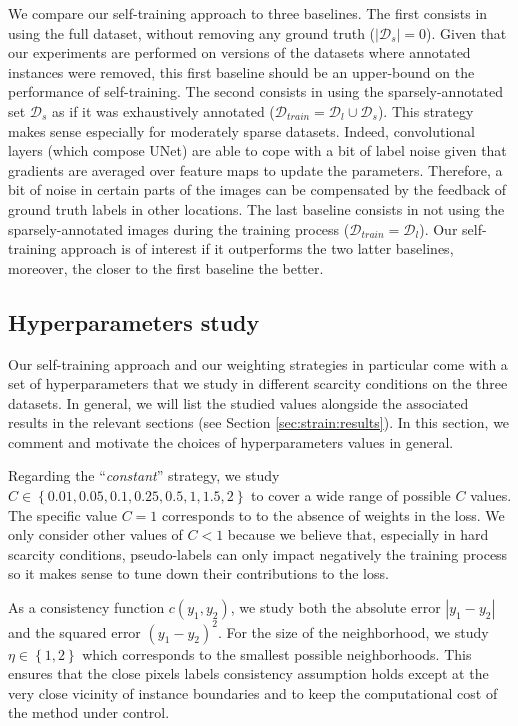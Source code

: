 We compare our self-training approach to three baselines. The first consists in using the full dataset, without removing any ground truth (\ie $|\mathcal{D}_s| = 0$). Given that our experiments are performed on versions of the datasets where annotated instances were removed, this first baseline should be an upper-bound on the performance of self-training. The second consists in using the sparsely-annotated set $\mathcal{D}_s$ as if it was exhaustively annotated ($\mathcal{D}_{train} = \mathcal{D}_l \cup \mathcal{D}_s$). This strategy makes sense especially for moderately sparse datasets. Indeed, convolutional layers (which compose UNet) are able to cope with a bit of label noise given that gradients are averaged over feature maps to update the parameters. Therefore, a bit of noise in certain parts of the images can be compensated by the feedback of ground truth labels in other locations. The last baseline consists in not using the sparsely-annotated images during the training process (\ie $\mathcal{D}_{train} = \mathcal{D}_l$). Our self-training approach is of interest if it outperforms the two latter baselines, moreover, the closer to the first baseline the better.

\subsection{Hyperparameters study}

Our self-training approach and our weighting strategies in particular come with a set of hyperparameters that we study in different scarcity conditions on the three datasets. In general, we will list the studied values alongside the associated results in the relevant sections (see Section \ref{sec:strain:results}). In this section, we comment and motivate the choices of hyperparameters values in general. 

Regarding the ``\textit{constant}'' strategy, we study $C \in \left\{0.01, 0.05, 0.1, 0.25, 0.5, 1, 1.5, 2\right\}$ to cover a wide range of possible $C$ values. The specific value $C = 1$ corresponds to to the absence of weights in the loss. We only consider other values of $C < 1$ because we believe that, especially in hard scarcity conditions, pseudo-labels can only impact negatively the training process so it makes sense to tune down their contributions to the loss. 

As a consistency function $c(y_1, y_2)$, we study both the absolute error $|y_1-y_2|$ and the squared error $(y_1-y_2)^2$. For the size of the neighborhood, we study $\eta \in \left\{1, 2\right\}$ which corresponds to the smallest possible neighborhoods. This ensures that the close pixels labels consistency assumption holds except at the very close vicinity of instance boundaries and to keep the computational cost of the method under control.

